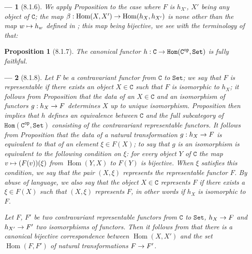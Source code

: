 \documentclass[oneside]{amsart}
\theoremstyle{ega-env-style}
\newtheorem*{env}{---}
\theoremstyle{ega-thm-env-style}
\newtheorem*{proposition}{Proposition}
\theoremstyle{ega-defn-env-style}
\def\cat{\mathtt}                   %
\def\C{\cat{C}}                     %
\def\op{^\cat{op}}                  %
\def\Set{\cat{Set}}                 %
\def\CHom{\cat{Hom}}                %
\def\Hom{\operatorname{Hom}}
\renewcommand{\to}{\mathchoice{\longrightarrow}{\rightarrow}{\rightarrow}{\rightarrow}}
\let\mapstoo\mapsto
\renewcommand{\mapsto}{\mathchoice{\longmapsto}{\mapstoo}{\mapstoo}{\mapstoo}}
\let\EGAOriginalLabel\label
\renewcommand{\label}[1]{\phantomsection\EGAOriginalLabel{#1}}
\begin{document}
\begin{env}[8.1.6]
\label{0.8.1.6}
We apply Proposition  to the case where $F$ is $h_{X'}$, $X'$ being any
object of $\C$; the map $\beta:\Hom(X,X')\to\Hom(h_X,h_{X'})$ is none other than the map
$w\mapsto h_w$ defined in ; this map being \emph{bijective}, we see
with the terminology of  that:
\end{env}

\begin{proposition}[8.1.7]
\label{0.8.1.7}
The canonical functor $h:\C\to\CHom(\C\op,\Set)$ is fully faithful.
\end{proposition}

\begin{env}[8.1.8]
\label{0.8.1.8}
Let $F$ be a contravariant functor from $\C$ to $\Set$; we say that $F$ is \emph{representable} if there
exists an object $X\in\C$ such that $F$ is \emph{isomorphic} to $h_X$; it follows from
Proposition  that the data of an $X\in\C$ and an isomorphism of functors
$g:h_X\to F$ determines $X$ up to unique isomorphism. Proposition  then
implies that $h$ defines an \emph{equivalence} between $\C$ and the full subcategory of
$\CHom(\C\op,\Set)$ consisting of the \emph{contravariant representable functors}. It follows from
Proposition  that the data of a natural transformation $g:h_X\to F$ is
equivalent to that of an element $\xi\in F(X)$; to say that $g$ is an \emph{isomorphism} is
equivalent to the following condition on $\xi$: \emph{for every object $Y$ of $\C$ the map
$v\mapsto(F(v))(\xi)$ from $\Hom(Y,X)$ to $F(Y)$ is bijective}. When $\xi$ satisfies this condition,
we say that the pair $(X,\xi)$ \emph{represents} the representable functor $F$. By abuse of language,
we also say that the object $X\in\C$ represents $F$ if there exists a $\xi\in F(X)$ such that
$(X,\xi)$ represents $F$, in other words if $h_X$ is isomorphic to $F$.

Let $F$, $F'$ be two contravariant representable functors from $\C$ to $\Set$, $h_X\to F$ and
$h_{X'}\to F'$ two isomorphisms of functors. Then it follows from  that
there is a canonical bijective correspondence between $\Hom(X,X')$ and the set $\Hom(F,F')$ of
natural transformations $F\to F'$.
\end{env}
\end{document}
